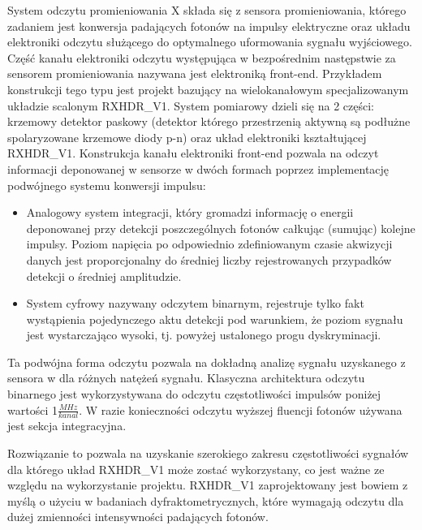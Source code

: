 System odczytu promieniowania X składa się z sensora promieniowania, którego zadaniem jest konwersja padających fotonów na impulsy elektryczne oraz układu elektroniki odczytu służącego do optymalnego uformowania  sygnału wyjściowego. Część kanału elektroniki odczytu występująca w bezpośrednim następstwie za sensorem promieniowania nazywana jest elektroniką front-end.
Przykładem konstrukcji tego typu jest projekt bazujący na wielokanałowym specjalizowanym układzie scalonym RXHDR\_V1. System pomiarowy dzieli się na 2 części: krzemowy detektor paskowy (detektor którego przestrzenią aktywną są podłużne spolaryzowane krzemowe diody p-n) \cite{master} \cite{front-end} oraz układ elektroniki kształtującej RXHDR\_V1. Konstrukcja kanału elektroniki front-end pozwala na odczyt informacji deponowanej w sensorze w dwóch formach poprzez implementację podwójnego systemu konwersji impulsu:
\begin{itemize}
        \item Analogowy system integracji, który gromadzi informację o energii deponowanej przy detekcji poszczególnych fotonów całkując (sumując) kolejne impulsy. Poziom napięcia po odpowiednio zdefiniowanym czasie akwizycji danych jest proporcjonalny do średniej liczby rejestrowanych przypadków detekcji o średniej amplitudzie. 
        \item System cyfrowy nazywany odczytem binarnym, rejestruje tylko fakt wystąpienia pojedynczego aktu detekcji pod warunkiem, że poziom sygnału jest wystarczająco wysoki, tj. powyżej ustalonego progu dyskryminacji.
\end{itemize} 

Ta podwójna forma odczytu pozwala na dokładną analizę sygnału uzyskanego z sensora w dla różnych natężeń sygnału. Klasyczna architektura odczytu binarnego jest wykorzystywana do odczytu częstotliwości impulsów poniżej wartości 1$\frac{MHz}{kanal}$. W razie konieczności odczytu wyższej fluencji fotonów używana jest sekcja integracyjna. 

Rozwiązanie to pozwala na uzyskanie szerokiego zakresu częstotliwości sygnałów dla którego układ RXHDR\_V1 może zostać wykorzystany, co jest ważne ze względu na wykorzystanie projektu. 
RXHDR\_V1 zaprojektowany jest bowiem z myślą o użyciu w badaniach dyfraktometrycznych, które wymagają odczytu dla dużej zmienności intensywności padających fotonów. 

